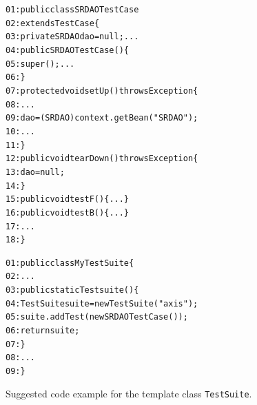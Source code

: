 \documentclass[conference]{IEEEtran}
\newcommand{\Caption}{\caption}
\newcommand{\CodeIn}[1]{{\small\texttt{#1}}}
\newenvironment{CodeOut}{\begin{small}}{\end{small}}
\begin{document}
\begin{figure}[t]
\begin{CodeOut}
\begin{alltt}
01:public class SRDAOTestCase 
02:\hspace*{0.4in}extends TestCase \{
03:\hspace*{0.1in}private SRDAO dao = null;...
04:\hspace*{0.1in}public SRDAOTestCase() \{
05:\hspace*{0.3in}super(); ... 
06:\hspace*{0.1in}\}
07:\hspace*{0.1in}protected void setUp() throws Exception \{
08:\hspace*{0.3in}...
09:\hspace*{0.3in}dao = (SRDAO)context.getBean("SRDAO");
10:\hspace*{0.3in}...
11:\hspace*{0.1in}\}
12:\hspace*{0.1in}public void tearDown() throws Exception \{
13:\hspace*{0.3in}dao = null; 
14:\hspace*{0.1in}\}
15:\hspace*{0.1in}public void testF() \{ ... \}
16:\hspace*{0.1in}public void testB() \{ ... \}
17:\hspace*{0.1in}...
18:\}
\end{alltt}
\end{CodeOut}
\Caption{\label{fig:hcodeexample} Suggested code example for the hook class \CodeIn{TestCase}.}
\begin{CodeOut}
\begin{alltt}
01:public class MyTestSuite \{ 
02:\hspace*{0.1in}...
03:\hspace*{0.1in}public static Test suite() \{
04:\hspace*{0.3in}TestSuite suite = new TestSuite("axis");
05:\hspace*{0.3in}suite.addTest(new SRDAOTestCase());
06:\hspace*{0.3in}return suite;
07:\hspace*{0.1in}\}
08:\hspace*{0.1in}...
09:\}
\end{alltt}
\end{CodeOut}
\Caption{\label{fig:tcodeexample} Suggested code example for the template class \CodeIn{TestSuite}.}\vspace{-2ex}
\end{figure}
\end{document}
